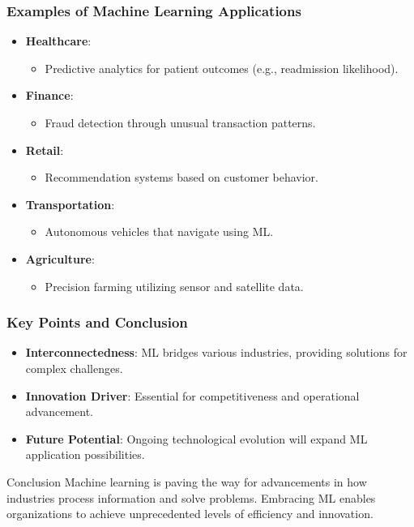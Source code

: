 \documentclass[aspectratio=169]{beamer}
\begin{document}
\begin{frame}[fragile]
    \frametitle{Examples of Machine Learning Applications}
    \begin{itemize}
        \item \textbf{Healthcare}:
            \begin{itemize}
                \item Predictive analytics for patient outcomes (e.g., readmission likelihood).
            \end{itemize}
        \item \textbf{Finance}:
            \begin{itemize}
                \item Fraud detection through unusual transaction patterns.
            \end{itemize}
        \item \textbf{Retail}:
            \begin{itemize}
                \item Recommendation systems based on customer behavior.
            \end{itemize}
        \item \textbf{Transportation}:
            \begin{itemize}
                \item Autonomous vehicles that navigate using ML.
            \end{itemize}
        \item \textbf{Agriculture}:
            \begin{itemize}
                \item Precision farming utilizing sensor and satellite data.
            \end{itemize}
    \end{itemize}
\end{frame}

\begin{frame}[fragile]
    \frametitle{Key Points and Conclusion}
    \begin{itemize}
        \item \textbf{Interconnectedness}: ML bridges various industries, providing solutions for complex challenges.
        \item \textbf{Innovation Driver}: Essential for competitiveness and operational advancement.
        \item \textbf{Future Potential}: Ongoing technological evolution will expand ML application possibilities.
    \end{itemize}
    \begin{block}{Conclusion}
        Machine learning is paving the way for advancements in how industries process information and solve problems. Embracing ML enables organizations to achieve unprecedented levels of efficiency and innovation.
    \end{block}
\end{frame}
\end{document}
